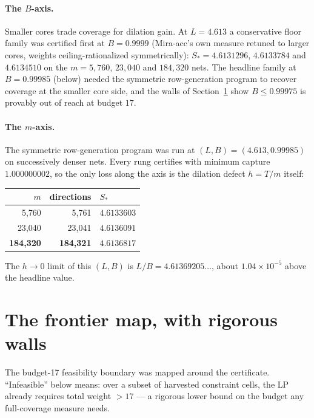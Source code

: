 \documentclass[11pt]{article}
\theoremstyle{definition}
\theoremstyle{remark}
\begin{document}
\paragraph{The $B$-axis.} Smaller cores trade coverage for dilation
gain. At $L=4.613$ a conservative floor family was certified first at
$B=0.9999$ (Mira-acc's own measure retuned to larger cores, weights
ceiling-rationalized symmetrically): $S_*=4.6131296$, $4.6133784$ and
$4.6134510$ on the $m=5{,}760$, $23{,}040$ and $184{,}320$ nets. The
headline family at $B=0.99985$ (below) needed the symmetric
row-generation program to recover coverage at the smaller core side, and
the walls of Section~\ref{sec:frontier} show $B\le0.99975$ is provably
out of reach at budget $17$.

\paragraph{The $m$-axis.} The symmetric row-generation program was run
at $(L,B)=(4.613,0.99985)$ on successively denser nets. Every rung
certifies with minimum capture $1.000000002$, so the only loss along
the axis is the dilation defect $h=T/m$ itself:

\begin{center}
\begin{tabular}{@{}rrl@{}}
\toprule
$m$ & directions & $S_*$\\
\midrule
5{,}760 & 5{,}761 & $4.6133603$\\
23{,}040 & 23{,}041 & $4.6136091$\\
\textbf{184{,}320} & \textbf{184{,}321} & $\mathbf{4.6136817}$\\
\bottomrule
\end{tabular}
\end{center}

The $h\to0$ limit of this $(L,B)$ is $L/B=4.61369205\ldots$, about
$1.04\times10^{-5}$ above the headline value.

\section{The frontier map, with rigorous walls}\label{sec:frontier}

The budget-17 feasibility boundary was mapped around the certificate.
``Infeasible'' below means: over a subset of harvested constraint cells,
the LP already requires total weight $>17$ --- a rigorous lower bound on
the budget any full-coverage measure needs.
\end{document}
